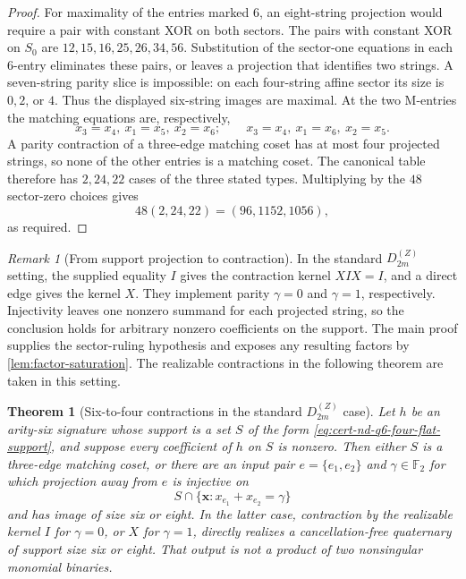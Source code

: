 \documentclass[11pt,letterpaper,onecolumn]{article}
\theoremstyle{plain}
\newtheorem{theorem}{Theorem}[section]
\theoremstyle{definition}
\theoremstyle{remark}
\newtheorem{remark}[remark]{Remark}
\newcommand{\Ftwo}{\mathbb F_2}
\newcommand{\DihZ}[1]{{D_{#1}^{(Z)}}}
\begin{document}
\begin{proof}
For maximality of the entries marked \(6\), an eight-string projection
would require a pair with constant XOR on both sectors.  The pairs with
constant XOR on \(S_0\) are
\(12,15,16,25,26,34,56\).  Substitution of the sector-one equations in
each \(6\)-entry eliminates these pairs, or leaves a projection that
identifies two strings.  A seven-string parity slice is impossible: on each
four-string affine sector its size is \(0,2\), or \(4\).  Thus the displayed
six-string images are maximal.  At the two \(\mathrm M\)-entries the
matching equations are, respectively,
\[
 x_3=x_4,\ x_1=x_5,\ x_2=x_6;
 \qquad
 x_3=x_4,\ x_1=x_6,\ x_2=x_5.
\]
A parity contraction of a three-edge matching coset has at most four
projected strings, so none of the other entries is a matching coset.
The canonical table therefore has \(2,24,22\) cases of the three stated
types.  Multiplying by the \(48\) sector-zero choices gives
\[
 48(2,24,22)=(96,1152,1056),
\]
as required.
\end{proof}

\begin{remark}[From support projection to contraction]
\label{rem:cert-nd-q6-support-scope}
In the standard \(\DihZ{2m}\) setting, the supplied equality \(I\)
gives the contraction kernel \(XIX=I\), and a direct edge gives the kernel
\(X\). They implement parity \(\gamma=0\) and \(\gamma=1\), respectively.
Injectivity leaves one nonzero summand for each projected string, so the
conclusion holds for arbitrary nonzero coefficients on the support.
The main proof supplies the sector-ruling hypothesis and exposes any
resulting factors by \cref{lem:factor-saturation}. The realizable
contractions in the following theorem are taken in this setting.
\end{remark}

\begin{theorem}[Six-to-four contractions in the standard \(\DihZ{2m}\) case]
\label{thm:cert-interface-nd-q6}
Let \(h\) be an arity-six signature whose support is a set \(S\) of the form
\cref{eq:cert-nd-q6-four-flat-support}, and suppose every coefficient of
\(h\) on \(S\) is nonzero.  Then either \(S\) is a three-edge matching
coset, or there are an input pair \(e=\{e_1,e_2\}\) and
\(\gamma\in\Ftwo\) for which projection away from \(e\) is injective on
\[
 S\cap\{{\mathbf{x}}:x_{e_1}+x_{e_2}=\gamma\}
\]
and has image of size six or eight.  In the latter case, contraction by the
realizable kernel \(I\) for \(\gamma=0\), or \(X\) for \(\gamma=1\), directly
realizes a cancellation-free quaternary of support size six or eight.  That
      output is not a product of two nonsingular monomial binaries.
\end{theorem}
\end{document}
